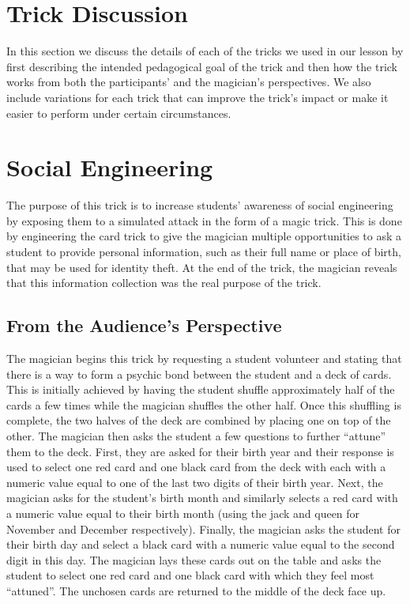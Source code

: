\section{Trick Discussion}
\label{SEC:background}

In this section we discuss the details of each of the tricks we used in our
lesson by first describing the intended pedagogical goal of the trick and then
how the trick works from both the participants' and the magician's
perspectives.  We also include variations for each trick that can improve the
trick's impact or make it easier to perform under certain circumstances.

\section{Social Engineering}

The purpose of this trick is to increase students' awareness of social
engineering by exposing them to a simulated attack in the form of a magic trick.
This is done by engineering the card trick to give the magician multiple
opportunities to ask a student to provide personal information, such as their
full name or place of birth, that may be used for identity theft.
At the end of the trick, the magician reveals that this information collection
was the real purpose of the trick.

\subsection{From the Audience's Perspective}

The magician begins this trick by requesting a student volunteer and stating
that there is a way to form a psychic bond between the student and a deck of
cards.  This is initially achieved by having the student shuffle approximately
half of the cards a few times while the magician shuffles the other half.  Once
this shuffling is complete, the two halves of the deck are combined by placing
one on top of the other.
The magician then asks the student
a few questions to further ``attune'' them to the deck.
First, they are asked for their birth year and their response
is used to select one red card and one black card from the deck
with each with a numeric value equal to one of the last two digits of their
birth year.
Next, the magician asks for the student's birth month and similarly selects
a red card with a numeric value equal
to their birth month (using the jack and queen for November and December
respectively).
Finally, the magician asks the student
for their birth day and select a black card with a numeric value
equal to the second digit in this day.
The magician lays these cards out on the table and asks the student to select
one red card and one black card with which they feel most ``attuned''.
The unchosen cards are returned to the middle
of the deck face up.

